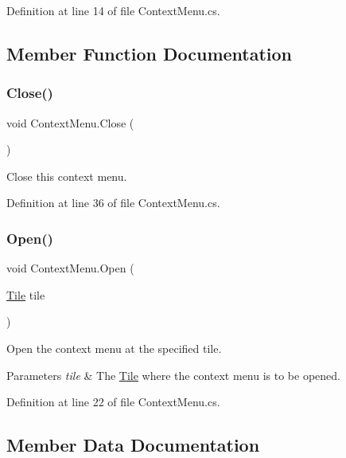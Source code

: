 Definition at line 14 of file Context\+Menu.\+cs.



\subsection{Member Function Documentation}
\mbox{\label{class_context_menu_af006f7eed65862d739697b80f267119b}} 
\subsubsection{\texorpdfstring{Close()}{Close()}}
{\footnotesize\ttfamily void Context\+Menu.\+Close (\begin{DoxyParamCaption}{ }\end{DoxyParamCaption})}



Close this context menu. 



Definition at line 36 of file Context\+Menu.\+cs.

\mbox{\label{class_context_menu_a09a23a7066bb880128dff3eaa7731787}} 
\subsubsection{\texorpdfstring{Open()}{Open()}}
{\footnotesize\ttfamily void Context\+Menu.\+Open (\begin{DoxyParamCaption}\item[{\hyperlink{class_tile}{Tile}}]{tile }\end{DoxyParamCaption})}



Open the context menu at the specified tile. 


\begin{DoxyParams}{Parameters}
{\em tile} & The \hyperlink{class_tile}{Tile} where the context menu is to be opened.\\
\hline
\end{DoxyParams}


Definition at line 22 of file Context\+Menu.\+cs.



\subsection{Member Data Documentation}
\mbox{\label{class_context_menu_a1e8ca33e07938af81b9bf4f8525b6620}} 

